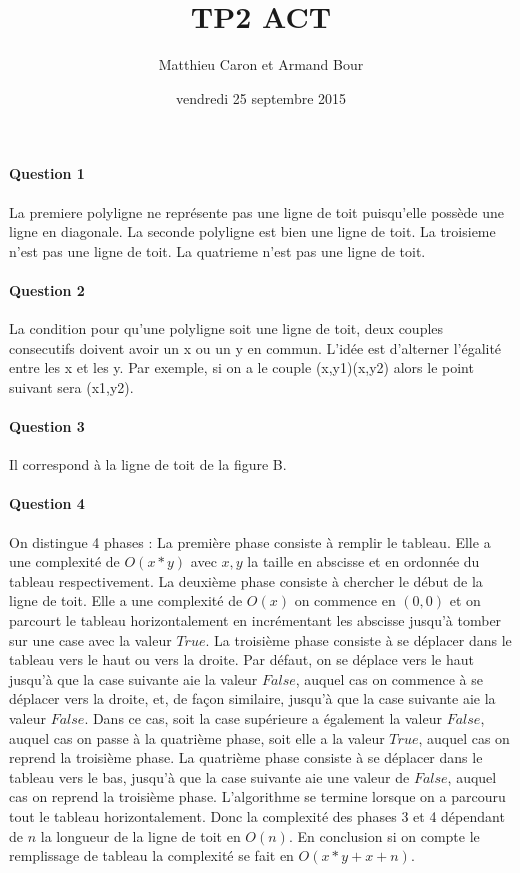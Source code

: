 \documentclass[a4paper,10pt]{article}
\title{TP2 ACT}
\author{Matthieu Caron et Armand Bour}
\date{vendredi 25 septembre 2015}
\begin{document}
\maketitle

\paragraph{Question 1}
La premiere polyligne ne représente pas une ligne de toit puisqu'elle possède une ligne en diagonale.\newline
La seconde polyligne est bien une ligne de toit.\newline
La troisieme n'est pas une ligne de toit.\newline
La quatrieme n'est pas une ligne de toit.\newline
\paragraph{Question 2}
La condition pour qu'une polyligne soit une ligne de toit, deux couples consecutifs doivent avoir un x ou un y en commun.
L'idée est d'alterner l'égalité entre les x et les y.
Par exemple, si on a le couple (x,y1)(x,y2) alors le point suivant sera (x1,y2). 
\paragraph{Question 3}
Il correspond à la ligne de toit de la figure B.
\paragraph{Question 4}
On distingue 4 phases : \newline
La première phase consiste à remplir le tableau. Elle a une complexité de $O(x*y)$ avec $x,y$ la taille en abscisse et en ordonnée du tableau respectivement.\newline
La deuxième phase consiste à chercher le début de la ligne de toit. Elle a une complexité de $O(x)$ on commence en $(0,0)$ et 
on parcourt le tableau horizontalement en incrémentant les abscisse jusqu'à tomber sur une case avec la valeur $True$.\newline
La troisième phase consiste à se déplacer dans le tableau vers le haut ou vers la droite. Par défaut, on se déplace vers le haut jusqu'à que la case suivante aie la valeur $False$, 
auquel cas on commence à se déplacer vers la droite, et, de façon similaire, jusqu'à que la case suivante aie la valeur $False$. 
Dans ce cas, soit la case supérieure a également la valeur $False$, auquel cas on passe à la quatrième phase, soit elle a la valeur $True$, auquel cas on reprend la troisième phase.\newline
La quatrième phase consiste à se déplacer dans le tableau vers le bas, jusqu'à que la case suivante aie une valeur de $False$, auquel cas on reprend la troisième phase.\newline
L'algorithme se termine lorsque on a parcouru tout le tableau horizontalement.\newline
Donc la complexité des phases 3 et 4 dépendant de $n$ la longueur de la ligne de toit en $O(n)$.
En conclusion si on compte le remplissage de tableau la complexité se fait en $O(x*y + x + n)$.
\end{document}
